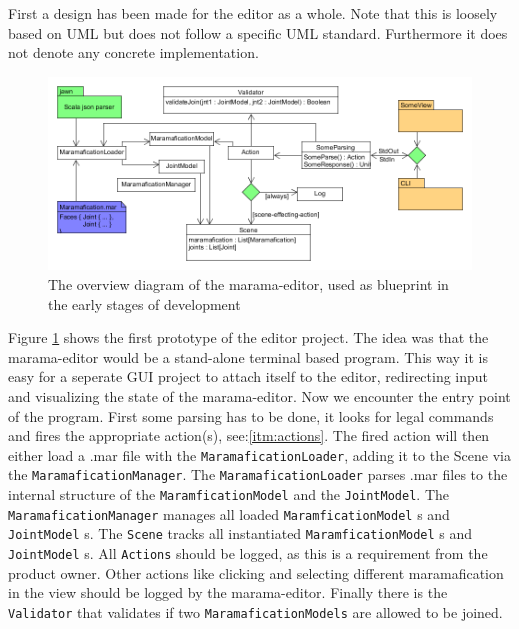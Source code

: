\documentclass[10pt]{extarticle} %
\newcommand{\code}[1]{\texttt{#1}} %
\begin{document}
    First a design has been made for the editor as a whole.
    Note that this is loosely based on UML but does not follow a specific UML standard.
    Furthermore it does not denote any concrete implementation.\\
    \begin{figure}[htb]
        \centering
        \includegraphics[width=\textwidth, height=\textheight, keepaspectratio]{architecture-marama-editor}
        \caption{The overview diagram of the marama-editor, used as blueprint in the early stages of development}
        \label{fig:ame}
    \end{figure}
    Figure \ref{fig:ame} shows the first prototype of the editor project.
    The idea was that the marama-editor would be a stand-alone terminal based program.
    This way it is easy for a seperate GUI project to attach itself to the editor, redirecting input and visualizing the state of the marama-editor.
    Now we encounter the entry point of the program.
    First some parsing has to be done, it looks for legal commands and fires the appropriate action(s), see:\ref{itm:actions}.
    The fired action will then either load a .mar file with the \code{MaramaficationLoader}, adding it to the Scene via the \code{MaramaficationManager}.
    The \code{MaramaficationLoader} parses .mar files to the internal structure of the \code{MaramficationModel} and the \code{JointModel}.
    The \code{MaramaficationManager} manages all loaded \code{MaramficationModel} s and \code{JointModel} s.
    The \code{Scene} tracks all instantiated \code{MaramficationModel} s and \code{JointModel} s.
    All \code{Actions} should be logged, as this is a requirement from the product owner.
    Other actions like clicking and selecting different maramafication in the view should be logged by the marama-editor.
    Finally there is the \code{Validator} that validates if two \code{MaramaficationModels} are allowed to be joined.
\end{document}
